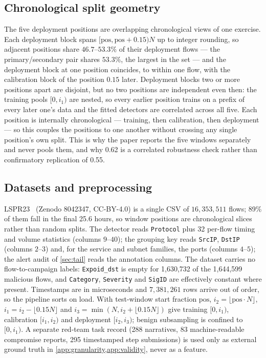 \documentclass[conference]{IEEEtran}
\begin{document}
\subsection{Chronological split geometry}\label{app:splits}

The five deployment positions are overlapping chronological views of one exercise. Each deployment
block spans $[\mathrm{pos},\mathrm{pos}+0.15)N$ up to integer rounding, so adjacent
positions share $46.7$--$53.3\%$ of their deployment flows --- the primary/secondary pair shares
$53.3\%$, the largest in the set --- and the deployment block at one position coincides, to within one
flow, with the calibration block of the position $0.15$ later. Deployment blocks two or more positions
apart are disjoint, but no two positions are independent even then: the training pools $[0,i_1)$ are
nested, so every earlier position trains on a prefix of every later one's data and the fitted detectors
are correlated across all five. Each position is internally chronological --- training, then
calibration, then deployment --- so this couples the positions to one another without crossing any
single position's own split. This is why the paper reports the five windows separately and never pools
them, and why 0.62 is a correlated robustness check rather than confirmatory replication of 0.55.

\subsection{Datasets and preprocessing}

LSPR23~\cite{lspr23} (Zenodo 8042347, CC-BY-4.0) is a single CSV of $16{,}353{,}511$ flows; 89\% of them
fall in the final 25.6 hours, so window positions are chronological slices rather than random splits. The
detector reads \texttt{Protocol} plus 32 per-flow timing and volume statistics (columns $9$--$40$); the
grouping key reads \texttt{SrcIP}, \texttt{DstIP} (columns $2$--$3$) and, for the service and subnet
families, the ports (columns $4$--$5$); the alert audit of \cref{sec:tail} reads the annotation columns.
The dataset carries no flow-to-campaign labels: \texttt{Expoid\_dst} is empty for 1,630,732 of the
1,644,599 malicious flows, and \texttt{Category}, \texttt{Severity} and \texttt{SigID} are effectively
constant where present. Timestamps are in microseconds and $7{,}381{,}261$ rows arrive out of order, so
the pipeline sorts on load. With test-window start fraction $\mathrm{pos}$,
$i_2=\lfloor\mathrm{pos}\cdot N\rfloor$, $i_1=i_2-\lfloor0.15N\rfloor$ and
$i_3=\min(N,i_2+\lfloor0.15N\rfloor)$ give training $[0,i_1)$, calibration $[i_1,i_2)$ and deployment
$[i_2,i_3)$; benign subsampling is confined to $[0,i_1)$. A separate red-team task record (288
narratives, 83 machine-readable compromise reports, 295 timestamped step submissions) is used only as
external ground truth in \cref{app:granularity,app:validity}, never as a feature.
\end{document}
